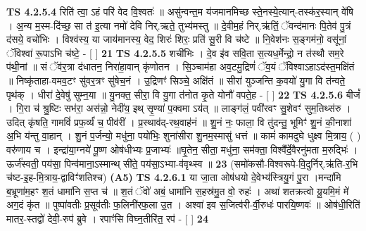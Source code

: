 \documentclass[17pt]{extarticle}
\begin{document}
                                \textbf{ TS 4.2.5.4} \newline
                  रिति॑ त्वा॒ ऽहं परि॑ वेद वि॒श्वतः॑ ॥ असु॑न्वन्त॒म य॑जमानमिच्छ स्ते॒नस्ये॒त्यान्-तस्क॑र॒स्यान् वे॑षि । अ॒न्य म॒स्म-दि॑च्छ॒ सा त॑ इ॒त्या नमो॑ देवि निर्.ऋते॒ तुभ्य॑मस्तु ॥ दे॒वीम॒हं निर्.ऋ॑तिं॒ ॅवन्द॑मानः पि॒तेव॑ पु॒त्रं द॑सये॒ वचो॑भिः । विश्व॑स्य॒ या जाय॑मानस्य॒ वेद॒ शिरः॑ शिरः॒ प्रति॑ सू॒री वि च॑ष्टे ॥ नि॒वेश॑नः स॒ङ्गम॑नो॒ वसू॑नां॒ ॅविश्वा॑ रू॒पाऽभि च॑ष्टे॒ - [  ] \textbf{  21} \newline
                  \newline
                                \textbf{ TS 4.2.5.5} \newline
                  शची॑भिः । दे॒व इ॑व सवि॒ता स॒त्यध॒र्मेन्द्रो॒ न त॑स्थौ सम॒रे प॑थी॒नां ॥ सं ॅव॑र॒त्रा द॑धातन॒ निरा॑हा॒वान् कृ॑णोतन । सि॒ञ्चाम॑हा अव॒टमु॒द्रिणं॑ ॅव॒यं ॅविश्वाऽहाऽद॑स्त॒मक्षि॑तं ॥ निष्कृ॑ताहा-वमव॒टꣳ सु॑वर॒त्रꣳ सु॑षेच॒नं । उ॒द्रिणꣳ॑ सिञ्चे॒ अक्षि॑तं ॥ सीरा॑ युञ्जन्ति क॒वयो॑ यु॒गा वि त॑न्वते॒ पृथ॑क् । धीरा॑ दे॒वेषु॑ सुम्न॒या ॥ यु॒नक्त॒ सीरा॒ वि यु॒गा त॑नोत कृ॒ते योनौ॑ वपते॒ह - [  ] \textbf{  22} \newline
                  \newline
                                \textbf{ TS 4.2.5.6} \newline
                  बीजं᳚ । गि॒रा च॑ श्रु॒ष्टिः सभ॑रा॒ अस॑न्नो॒ नेदी॑य॒ इथ् सृ॒ण्या॑ प॒क्वमा ऽय॑त् ॥ लाङ्ग॑लं॒ पवी॑रवꣳ सु॒शेवꣳ॑ सुम॒तिथ्स॑रु । उदित् कृ॑षति॒ गामविं॑ प्रफ॒र्व्यं॑ च॒ पीव॑रीं । प्र॒स्थाव॑द्-रथ॒वाह॑नं ॥ शु॒नं नः॒ फाला॒ वि तु॑दन्तु॒ भूमिꣳ॑ शु॒नं की॒नाशा॑ अ॒भि य॑न्तु वा॒हान् । शु॒नं प॒र्जन्यो॒ मधु॑ना॒ पयो॑भिः॒ शुना॑सीरा शु॒नम॒स्मासु॑ धत्तं ॥ कामं॑ कामदुघे धुक्ष्व मि॒त्राय॒ ( ) वरु॑णाय च । इन्द्रा॑या॒ग्नये॑ पू॒ष्ण ओष॑धीभ्यः प्र॒जाभ्यः॑ ॥घृ॒तेन॒ सीता॒ मधु॑ना॒ सम॑क्ता॒ विश्वै᳚र्दे॒वैरनु॑मता म॒रुद्भिः॑ । ऊर्ज॑स्वती॒ पय॑सा॒ पिन्व॑माना॒ऽस्मान्थ् सी॑ते॒ पय॑सा॒ऽभ्या-व॑वृथ्स्व ॥ \textbf{  23} \newline
                  \newline
                      (समो॑कसौ-विश्वरूपे-वि॒दुर्निर्.ऋ॑ति-र॒भि च॑ष्ट-इ॒ह-मि॒त्राय॒-द्वाविꣳ॑शतिश्च)  \textbf{(A5)} \newline \newline
                                        \textbf{ TS 4.2.6.1} \newline
                  या जा॒ता ओष॑धयो दे॒वेभ्य॑स्त्रियु॒गं पु॒रा ।मन्दा॑मि ब॒भ्रूणा॑म॒हꣳ श॒तं धामा॑नि स॒प्त च॑ ॥ श॒तं ॅवो॑ अबं॒ धामा॑नि स॒हस्र॑मु॒त वो॒ रुहः॑ । अथा॑ शतक्रत्वो यू॒यमि॒मं मे॑ अग॒दं कृ॑त ॥ पुष्पा॑वतीः प्र॒सूव॑तीः फ॒लिनी॑रफ॒ला उ॒त । अश्वा॑ इव स॒जित्व॑री-र्वी॒रुधः॑ पारयि॒ष्णवः॑ ॥ ओष॑धी॒रिति॑ मातर॒-स्तद्वो॑ देवी॒-रुप॑ ब्रुवे । रपाꣳ॑सि विघ्न॒तीरि॑त॒ रप॑ - [  ] \textbf{  24} \newline
\end{document}

